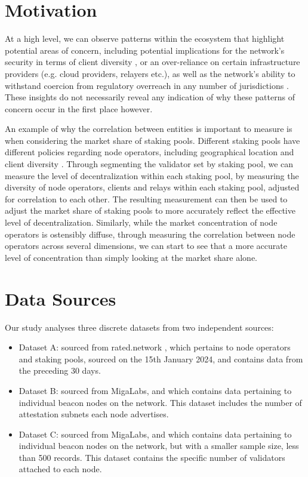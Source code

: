 \documentclass[conference]{IEEEtran}
\begin{document}
\section{Motivation}
\label{sec:motivation}

At a high level, we can observe patterns within the ecosystem that highlight potential areas of concern, including potential implications for the network's security in terms of client diversity \cite{clientdiversity2024}, or an over-reliance on certain infrastructure providers (e.g. cloud providers, relayers etc.), as well as the network's ability to withstand coercion from regulatory overreach in any number of jurisdictions \cite{wahrstatter2023}. These insights do not necessarily reveal any indication of why these patterns of concern occur in the first place however.

An example of why the correlation between entities is important to measure is when considering the market share of staking pools. Different staking pools have different policies regarding node operators, including geographical location and client diversity \cite{vanom2024}.  Through segmenting the validator set by staking pool, we can measure the level of decentralization within each staking pool, by measuring the diversity of node operators, clients and relays within each staking pool, adjusted for correlation to each other. The resulting measurement can then be used to adjust the market share of staking pools to more accurately reflect the effective level of decentralization.  Similarly, while the market concentration of node operators is ostensibly diffuse, through measuring the correlation between node operators across several dimensions, we can start to see that a more accurate level of concentration than simply looking at the market share alone.

\section{Data Sources}
\label{sec:data}

Our study analyses three discrete datasets from two independent sources:

\begin{itemize}
    \item Dataset A: sourced from rated.network \cite{ratednetwork2024}, which pertains to node operators and staking pools, sourced on the 15th January 2024, and contains data from the preceding 30 days.
    \item Dataset B: sourced from MigaLabs, and which contains data pertaining to individual beacon nodes on the network.  This dataset includes the number of attestation subnets each node advertises.
    \item Dataset C: sourced from MigaLabs, and which contains data pertaining to individual beacon nodes on the network, but with a smaller sample size, less than 500 records. This dataset contains the specific number of validators attached to each node.
\end{itemize}
\end{document}
